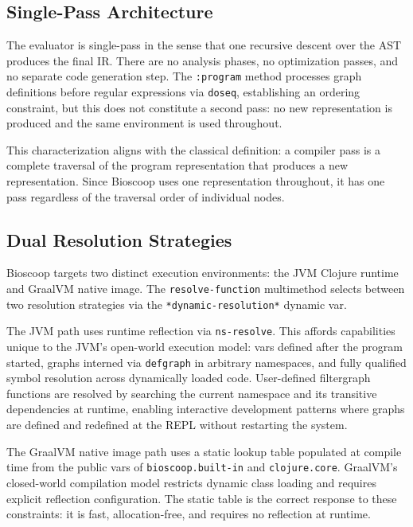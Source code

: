\documentclass[conference]{IEEEtran}
\begin{document}
\subsection{Single-Pass Architecture}

The evaluator is single-pass in the sense that one recursive descent over the AST produces the final IR. There are no analysis phases, no optimization passes, and no separate code generation step. The \texttt{:program} method processes graph definitions before regular expressions via \texttt{doseq}, establishing an ordering constraint, but this does not constitute a second pass: no new representation is produced and the same environment is used throughout.

This characterization aligns with the classical definition: a compiler pass is a complete traversal of the program representation that produces a new representation. Since Bioscoop uses one representation throughout, it has one pass regardless of the traversal order of individual nodes.

\subsection{Dual Resolution Strategies}

Bioscoop targets two distinct execution environments: the JVM Clojure runtime and GraalVM native image. The \texttt{resolve-function} multimethod selects between two resolution strategies via the \texttt{*dynamic-resolution*} dynamic var.

The JVM path uses runtime reflection via \texttt{ns-resolve}. This affords capabilities unique to the JVM's open-world execution model: vars defined after the program started, graphs interned via \texttt{defgraph} in arbitrary namespaces, and fully qualified symbol resolution across dynamically loaded code. User-defined filtergraph functions are resolved by searching the current namespace and its transitive dependencies at runtime, enabling interactive development patterns where graphs are defined and redefined at the REPL without restarting the system.

The GraalVM native image path uses a static lookup table populated at compile time from the public vars of \texttt{bioscoop.built-in} and \texttt{clojure.core}. GraalVM's closed-world compilation model restricts dynamic class loading and requires explicit reflection configuration. The static table is the correct response to these constraints: it is fast, allocation-free, and requires no reflection at runtime.
\end{document}
